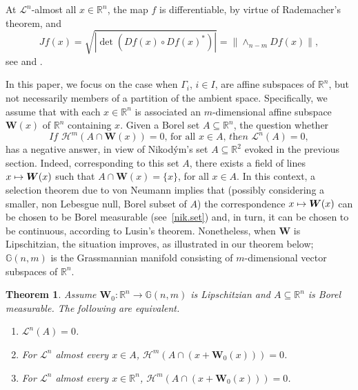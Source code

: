 \documentclass[JEP,XML,SOM,Unicode,ThmDefs,NoEqCountersInSection]{cedram}
\newcommand\mto{\mathchoice{\longmapsto}{\mapsto}{\mapsto}{\mapsto}}
\newtheorem*{Theorem*}{Theorem}
\newcommand{\R}{\mathbb{R}}
\newcommand{\Rn}{\R^n}
\newcommand{\calH}{\mathscr{H}}
\newcommand{\calL}{\mathscr{L}}
\newcommand{\bW}{{\boldsymbol{W}}}
\newcommand{\bG}{\mathbb{G}}
\let\subset\subseteq
\begin{document}
At $\calL^n$-almost all $x \in \Rn$, the map $f$ is differentiable, by virtue of Rademacher's theorem, and
\begin{equation*}
Jf(x) = \sqrt{ \left| \det \left(Df(x) \circ Df(x)^*\right)\right|} =\| {\wedge}_{n-m} Df(x)\|,
\end{equation*}
see \cite[Chap.\,3, \S 4]{EVANS.GARIEPY} and \cite[3.2.1 \& 3.2.11]{GMT}.
\par
In this paper, we focus on the case when $\Gamma_i$, $i \in I$, are affine subspaces of $\Rn$, but not necessarily members of a partition of the ambient space.
Specifically, we assume that with each $x \in \Rn$ is associated an $m$-dimensional affine subspace $\bW(x)$ of $\Rn$ containing $x$.
Given a Borel set $A \subset \Rn$, the question whether
\begin{equation}
\label{eq.1}
\textit{If } \calH^m(A \cap \bW(x))=0 \text{, for all } x \in A \textit{, then } \calL^n(A)=0,
\end{equation}
has a negative answer, in view of Nikod\'ym's set $A \subset \R^2$ evoked in the previous section.
Indeed, corresponding to this set $A$, there exists a field of lines $x \mto \bW(x)$ such that $A \cap \bW(x) = \{x\}$, for all $x \in A$.
In this context, a selection theorem due to von Neumann implies that (possibly considering a smaller, non Lebesgue null, Borel subset of $A$) the correspondence $x \mto \bW(x)$ can be chosen to be Borel measurable (see~\ref{nik.set}) and, in turn, it can be chosen to be continuous, according to Lusin's theorem.
Nonetheless, when $\bW$ is Lipschitzian, the situation improves, as illustrated in our theorem below; $\bG(n,m)$ is the Grassmannian manifold consisting of $m$-dimensional vector subspaces of $\Rn$.

\begin{Theorem*}
Assume $\bW_0: \Rn \to \bG(n,m)$ is Lipschitzian and $A \subset \Rn$ is Borel measurable. The following are equivalent.
\begin{enumerate}\renewcommand{\theenumi}{\Alph{enumi}}
\item\label{enum:thA} $\calL^n(A)=0$.
\item\label{enum:thB} For $\calL^n$ almost every $x \in A$, $\calH^m\left(A \cap (x+\bW_0(x))\right)=0$.
\item\label{enum:thC} For $\calL^n$ almost every $x \in \Rn$, $\calH^m\left(A \cap (x+\bW_0(x))\right)=0$.
\end{enumerate}
\end{Theorem*}
\end{document}
